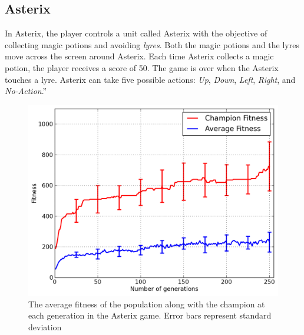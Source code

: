 \documentclass{acm_proc_article-sp}
\begin{document}
\subsection {Asterix}
In Asterix, the player controls a unit called Asterix with the objective of collecting magic potions and avoiding \textit{lyres}. Both the magic potions and the lyres move across the screen around Asterix. Each time Asterix collects a magic potion, the player receives a score of 50. The game is over when the Asterix touches a lyre. Asterix can take five possible actions: \textit{Up}, \textit{Down}, \textit{Left}, \textit{Right}, and \textit{No-Action}.''

\begin{figure}[ht]
\begin{center}
\includegraphics[width=\columnwidth]{figures/asterix-results.png}
\end{center}
\caption{The average fitness of the population along with the champion at each generation in the Asterix game. Error bars represent standard deviation}
\label{fig:asterix-curve}
\end{figure}
\end{document}
